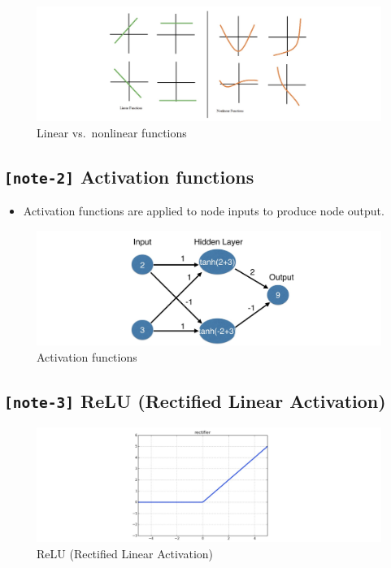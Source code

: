 \documentclass[11pt, twoside]{article}
\providecommand{\tightlist}{%
      \setlength{\itemsep}{0pt}\setlength{\parskip}{0pt}}
\begin{document}
\begin{figure}
\centering
\includegraphics{../Figures/6. Linear vs. nonlinear functions.jpg}
\caption{Linear vs.~nonlinear functions}
\end{figure}

    \hypertarget{note-2-activation-functions}{%
\subsection{\texorpdfstring{\texttt{{[}note-2{]}} Activation
functions}{{[}note-2{]} Activation functions}}\label{note-2-activation-functions}}

\begin{itemize}
\tightlist
\item
  Activation functions are applied to node inputs to produce node
  output.
\end{itemize}

\begin{figure}
\centering
\includegraphics{../Figures/7. Activation functions.jpg}
\caption{Activation functions}
\end{figure}

    \hypertarget{note-3-relu-rectified-linear-activation}{%
\subsection{\texorpdfstring{\texttt{{[}note-3{]}} ReLU (Rectified Linear
Activation)}{{[}note-3{]} ReLU (Rectified Linear Activation)}}\label{note-3-relu-rectified-linear-activation}}

\begin{figure}
\centering
\includegraphics{../Figures/8. ReLU (Rectified Linear Activation).jpg}
\caption{ReLU (Rectified Linear Activation)}
\end{figure}
\end{document}
